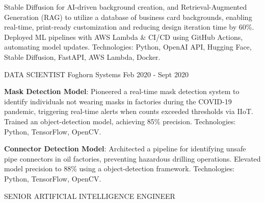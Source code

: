 \begin{cventries}
{\begin{cvitems}
{      Stable Diffusion for AI-driven background creation, and Retrieval-Augmented Generation (RAG) to utilize a database of business card backgrounds, enabling real-time, print-ready customization and reducing design iteration time by 60\%. 
      \newline
      Deployed ML pipelines with AWS Lambda \& CI/CD using GitHub Actions, automating model updates.
      \newline
      Technologies: Python, OpenAI API, Hugging Face, Stable Diffusion, FastAPI, AWS Lambda, Docker.}
	\end{cvitems}
    }
\vspace{2em} %
  \cventry
    {DATA SCIENTIST} %
    {Foghorn Systems} %
    {} %
    {Feb 2020 - Sept 2020} %
    {
      \begin{cvitems} %
        \item{\textbf{Mask Detection Model}: \newline 
        Pioneered a real-time mask detection system to identify individuals not wearing masks in factories during the COVID-19 pandemic, triggering 
        real-time alerts when counts exceeded thresholds via IIoT. \newline
        Trained an  object-detection model, 
        achieving 85\% precision. \newline Technologies: Python, TensorFlow, OpenCV.}        
        \item{\textbf{Connector Detection Model}: \newline Architected a pipeline for identifying unsafe pipe connectors in oil factories, preventing 
        hazardous drilling operations. \newline
        Elevated model precision to 88\% using a  object-detection framework. \newline
        Technologies: Python, TensorFlow, OpenCV.}
	\end{cvitems}
    }
\vspace{2em} %
  \cventry
    {SENIOR ARTIFICIAL INTELLIGENCE ENGINEER} %

\end{cventries}

